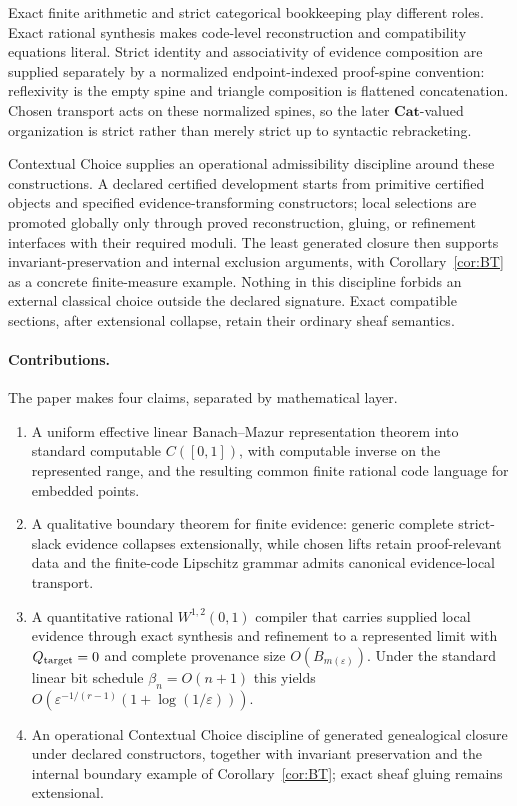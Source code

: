 \documentclass[11pt]{article}
\theoremstyle{definition}
\begin{document}
Exact finite arithmetic and strict categorical bookkeeping play different roles.  Exact
rational synthesis makes code-level reconstruction and compatibility equations literal.
Strict identity and associativity of evidence composition are supplied separately by a
normalized endpoint-indexed proof-spine convention: reflexivity is the empty spine and
triangle composition is flattened concatenation.  Chosen transport acts on these normalized
spines, so the later $\mathbf{Cat}$-valued organization is strict rather than merely strict
up to syntactic rebracketing.

Contextual Choice supplies an operational admissibility discipline around these
constructions.  A declared certified development starts from primitive certified objects
and specified evidence-transforming constructors; local selections are promoted globally
only through proved reconstruction, gluing, or refinement interfaces with their required
moduli.  The least generated closure then supports invariant-preservation and internal
exclusion arguments, with Corollary~\ref{cor:BT} as a concrete finite-measure example.
Nothing in this discipline forbids an external classical choice outside the declared
signature.  Exact compatible sections, after extensional collapse, retain their ordinary
sheaf semantics.

\paragraph{Contributions.}
The paper makes four claims, separated by mathematical layer.
\begin{enumerate}[label=(\roman*),leftmargin=2.2em,itemsep=2pt,topsep=3pt]
\item A uniform effective linear Banach--Mazur representation theorem into standard
computable $C([0,1])$, with computable inverse on the represented range, and the resulting
common finite rational code language for embedded points.
\item A qualitative boundary theorem for finite evidence: generic complete strict-slack
evidence collapses extensionally, while chosen lifts retain proof-relevant data and the
finite-code Lipschitz grammar admits canonical evidence-local transport.
\item A quantitative rational $W^{1,2}(0,1)$ compiler that carries supplied local evidence
through exact synthesis and refinement to a represented limit with $Q_{\rm target}=0$ and
complete provenance size $O(B_{m(\varepsilon)})$.  Under the standard linear bit schedule
$\beta_n=O(n+1)$ this yields
$O(\varepsilon^{-1/(r-1)}(1+\log(1/\varepsilon)))$.
\item An operational Contextual Choice discipline of generated genealogical closure under
declared constructors, together with invariant preservation and the internal boundary
example of Corollary~\ref{cor:BT}; exact sheaf gluing remains extensional.
\end{enumerate}
\end{document}
